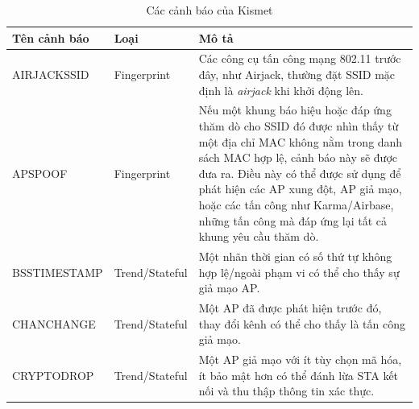\begin{table}[!htbp]
\centering
\small
\setlength{\extrarowheight}{0.2pt}
\caption{\label{tab:cac-canh-bao-cua-kismet}Các cảnh báo của Kismet}
\begin{tabular}{|p{4.4cm}|p{2.3cm}|p{7.3cm}|}
\hline
\textbf{Tên cảnh báo}                                                         & \textbf{Loại}  & \textbf{Mô tả}                                                                                                                                                                                                                                                                                                       \\ \hline
AIRJACKSSID                                                                   & Fingerprint    & Các công cụ tấn công mạng 802.11 trước đây, như Airjack, thường đặt SSID mặc định là \emph{airjack} khi khởi động lên.                                                                                                                                                                                                         \\ \hline
APSPOOF                                                                       & Fingerprint    & Nếu một khung báo hiệu hoặc đáp ứng thăm dò cho SSID đó được nhìn thấy từ một địa chỉ MAC không nằm trong danh sách MAC hợp lệ, cảnh báo này sẽ được đưa ra. Điều này có thể được sử dụng để phát hiện các AP xung đột, AP giả mạo, hoặc các tấn công như Karma/Airbase, những tấn công mà đáp ứng lại tất cả khung yêu cầu thăm dò. \\ \hline
BSSTIMESTAMP                                                                  & Trend/Stateful & Một nhãn thời gian có số thứ tự không hợp lệ/ngoài phạm vi có thể cho thấy sự giả mạo AP.                                                                                                                                                                                                                            \\ \hline
CHANCHANGE                                                                    & Trend/Stateful & Một AP đã được phát hiện trước đó, thay đổi kênh có thể cho thấy là tấn công giả mạo.                                                                                                                                                                                                                                \\ \hline
CRYPTODROP                                                                    & Trend/Stateful & Một AP giả mạo với ít tùy chọn mã hóa, ít bảo mật hơn có thể đánh lừa STA kết nối và thu thập thông tin xác thực.                                                                                                                                                                                          \\ \hline

\end{tabular}
\end{table}
